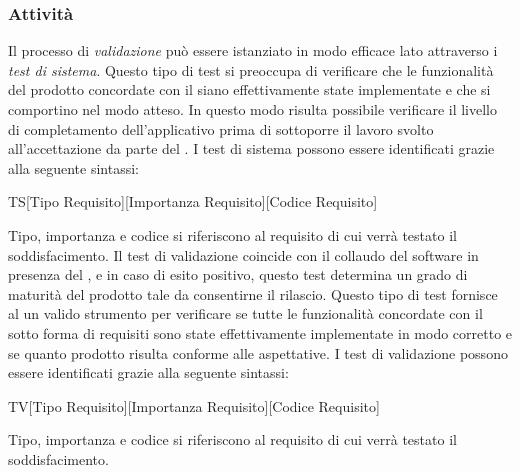 \subsubsection{Attività}\label{attivitaValidazione}
\label{testProcessoValidazione}
Il processo di \textit{validazione} può essere istanziato in modo efficace lato \textit{} attraverso i \textit{test di sistema}.
Questo tipo di test si preoccupa di verificare che le funzionalità del prodotto concordate con il  siano effettivamente state implementate e che si comportino nel modo atteso. In questo modo risulta possibile verificare il livello di completamento dell'applicativo prima di sottoporre il lavoro svolto all'accettazione da parte del .
I test di sistema possono essere identificati grazie alla seguente sintassi:
\begin{center}
TS[Tipo Requisito][Importanza Requisito][Codice Requisito]
\end{center}
Tipo, importanza e codice si riferiscono al requisito di cui verrà testato il soddisfacimento.
Il test di validazione coincide con il collaudo del software in presenza del , e in caso di esito positivo, questo test determina un grado di maturità del prodotto tale da consentirne il rilascio.
Questo tipo di test fornisce al  un valido strumento per verificare se tutte le funzionalità concordate con il  sotto forma di requisiti sono state effettivamente implementate in modo corretto e se quanto prodotto risulta conforme alle aspettative.
I test di validazione possono essere identificati grazie alla seguente sintassi:
\begin{center}
TV[Tipo Requisito][Importanza Requisito][Codice Requisito]
\end{center}
Tipo, importanza e codice si riferiscono al requisito di cui verrà testato il soddisfacimento.
